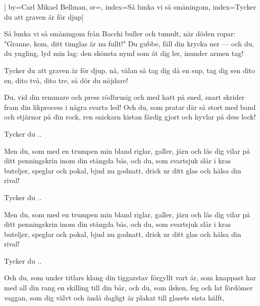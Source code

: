 

[ 		%
	by={Carl Mikael Bellman},					%
	sr={},					%
	index={Så lunka vi så småningom}, %
	index={Tycker du att graven är för djup}]						%
	
\beginverse*						%
Så lunka vi så småningom
från Bacchi buller och tumult,
när döden ropar: "Granne, kom,
ditt timglas är nu fullt!"
Du gubbe, fäll din krycka ner —
och du, du yngling, lyd min lag:
den skönsta nymf som åt dig ler,
inunder armen tag!
\endverse							%

\beginchorus						%
Tycker du att graven är för djup,
nå, välan så tag dig då en sup,
tag dig sen dito en, dito två, dito tre,
så dör du nöjdare!
\endchorus							%

\beginverse*
Du, vid din remmare och press
rödbrusig och med hatt på sned,
snart skrider fram din likprocess
i några svarta led!
Och du, som pratar där så stort
med band och stjärnor på din rock,
ren snickarn kistan färdig gjort
och hyvlar på dess lock!
\endverse

\beginchorus						%
Tycker du ..
\endchorus							%

\beginverse*
Men du, som med en trumpen min
bland riglar, galler, järn och lås
dig vilar på ditt penningskrin
inom din stängda bås,
och du, som svartsjuk slår i kras
buteljer, speglar och pokal,
bjud nu godnatt, drick ur ditt glas
och hälsa din rival!
\endverse

\beginchorus						%
Tycker du ..
\endchorus

\beginverse*
Men du, som med en trumpen min
bland riglar, galler, järn och lås
dig vilar på ditt penningskrin
inom din stängda bås,
och du, som svartsjuk slår i kras
buteljer, speglar och pokal,
bjud nu godnatt, drick ur ditt glas
och hälsa din rival!
\endverse

\beginchorus						%
Tycker du ..
\endchorus

\beginverse*
Och du, som under titlars klang
din tiggarstav förgyllt vart år,
som knappast har med all din rang
en skilling till din bår,
och du, som ilsken, feg och lat
fördömer vaggan, som dig välvt
och ändå dagligt är plakat
till glasets sista hälft,
\endverse


